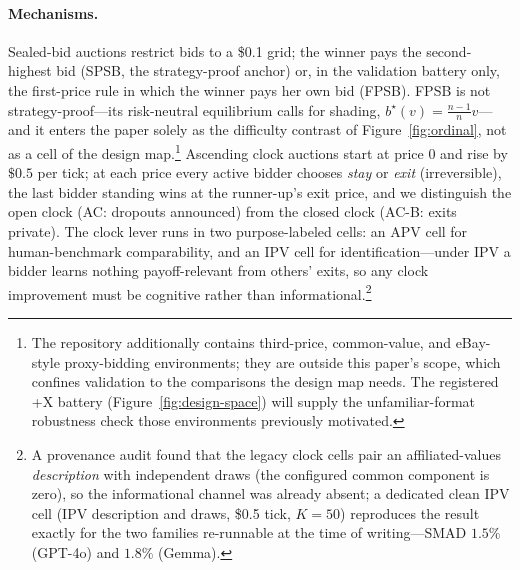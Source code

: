\paragraph{Mechanisms.}
Sealed-bid auctions restrict bids to a \$0.1 grid; the winner pays the second-highest bid (SPSB, the strategy-proof anchor) or, in the validation battery only, the first-price rule in which the winner pays her own bid (FPSB). FPSB is not strategy-proof---its risk-neutral equilibrium calls for shading, $b^\star(v) = \frac{n-1}{n}v$---and it enters the paper solely as the difficulty contrast of Figure~\ref{fig:ordinal}, not as a cell of the design map.\footnote{The repository additionally contains third-price, common-value, and eBay-style proxy-bidding environments; they are outside this paper's scope, which confines validation to the comparisons the design map needs. The registered +X battery (Figure~\ref{fig:design-space}) will supply the unfamiliar-format robustness check those environments previously motivated. } Ascending clock auctions start at price $0$ and rise by $\$0.5$ per tick; at each price every active bidder chooses \emph{stay} or \emph{exit} (irreversible), the last bidder standing wins at the runner-up's exit price, and we distinguish the open clock (AC: dropouts announced) from the closed clock (AC-B: exits private). The clock lever runs in two purpose-labeled cells: an APV cell for human-benchmark comparability, and an IPV cell for identification---under IPV a bidder learns nothing payoff-relevant from others' exits, so any clock improvement must be cognitive rather than informational.\footnote{A provenance audit found that the legacy clock cells pair an affiliated-values \emph{description} with independent draws (the configured common component is zero), so the informational channel was already absent; a dedicated clean IPV cell (IPV description and draws, \$0.5 tick, $K=50$) reproduces the result exactly for the two families re-runnable at the time of writing---SMAD $1.5\%$ (GPT-4o) and $1.8\%$ (Gemma). }

